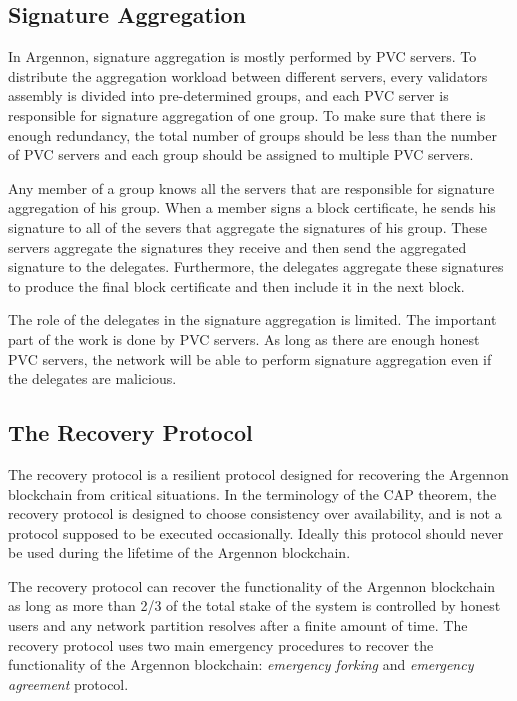 \subsection{Signature Aggregation}\label{subsec:sig-agg}

In Argennon, signature aggregation is mostly performed by PVC servers. To distribute the aggregation workload
between different servers, every validators assembly is divided into pre-determined groups, and each PVC
server is responsible for signature aggregation of one group. To make sure that there is enough redundancy, the
total number of groups should be less than the number of PVC servers and each group should be assigned to
multiple PVC servers.

Any member of a group knows all the servers that are responsible for signature aggregation of his group. When a member
signs a block certificate, he sends his signature to all of the severs that aggregate the signatures of his group.
These servers aggregate the signatures they receive and then send the aggregated signature to the delegates.
Furthermore, the delegates aggregate these signatures to produce the final block certificate
and then include it in the next block.

The role of the delegates in the signature aggregation is limited. The important part of the work is done by PVC
servers. As long as there are enough honest PVC servers, the network will be able to perform signature aggregation
even if the delegates are malicious.

\subsection{The Recovery Protocol}\label{subsec:recovery}

The recovery protocol is a resilient protocol designed for recovering the Argennon blockchain from critical situations.
In the terminology of the CAP theorem, the recovery protocol is designed to choose consistency over availability,
and is not a protocol supposed to be executed occasionally. Ideally this protocol should never be used
during the lifetime of the Argennon blockchain.

The recovery protocol can recover the functionality
of the Argennon blockchain as long as more than 2/3 of the total stake of the system is controlled by honest users
and any network partition resolves after a finite amount of time. The recovery protocol uses two main emergency
procedures to recover the functionality of the Argennon blockchain: \emph{emergency forking} and \emph{emergency
agreement} protocol.

